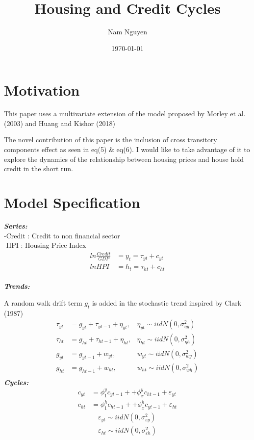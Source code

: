 \documentclass[fleqn]{article}
\title{Housing and Credit Cycles}
\author{Nam Nguyen}
\date{\today}
\begin{document}
	\maketitle
	
\begin{outline}[enumerate]

\section{Motivation}

This paper uses a multivariate extension of the model proposed by Morley et al. (2003) and Huang and Kishor (2018)

The novel contribution of this paper is the inclusion of cross transitory components effect as seen in eq(5) \& eq(6). I would like to take advantage of it to explore the dynamics of the relationship between housing prices and house hold credit in the short run.
		
\section {Model Specification}

\textbf{\textit{Series:}} \\
-Credit : Credit to non financial sector\\
-HPI : Housing Price Index
	\begin{align}
	ln \frac{Credit}{GDP} &= y_t = \tau_{yt} + c_{yt}
	\\
	ln HPI &= h_t = \tau_{ht} + c_{ht}
	\end{align}
	\\
\textbf{\textit{Trends:}}


A random walk drift term $g_t$ is added in the stochastic trend inspired by Clark (1987)
	\begin{align}
	\tau_{yt} &= g_{yt} + \tau_{yt-1} + \eta_{yt}, &\eta_{yt} \sim iidN(0,\sigma^2_{\eta y})
	\\
	\tau_{ht} &= g_{ht} + \tau_{ht-1} + \eta_{ht}, &\eta_{ht} \sim iidN(0,\sigma^2_{\eta h})	
	\\
	g_{yt} &= g_{yt-1} + w_{yt}, &w_{yt} \sim iidN(0,\sigma^2_{w y})
	\\
	g_{ht} &= g_{ht-1} + w_{ht}, &w_{ht} \sim iidN(0,\sigma^2_{w h})
	\\
	\end{align}
\textbf{\textit{Cycles:}}
	\begin{align}
	c_{yt} &= \phi^y_{1}c_{yt-1} + 
		   + \phi^y_{x}c_{ht-1} 
		   + \varepsilon_{yt}
	\\
	c_{ht} &= \phi^h_{1}c_{ht-1} + 
		   + \phi^h_{x}c_{yt-1}  
	   	   + \varepsilon_{ht}
	\end{align}
	\begin{align*}
	\varepsilon_{yt} \sim iidN(0,\sigma^2_{\varepsilon y})
	\\
	\varepsilon_{ht} \sim iidN(0,\sigma^2_{\varepsilon h})
	\end{align*}


\end{outline}
\end{document}
